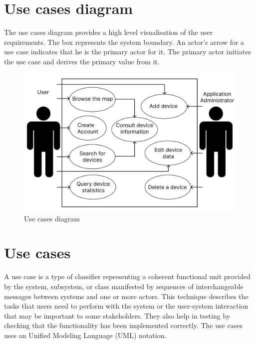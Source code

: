 \documentclass{scrreprt}
\begin{document}
\section{Use cases diagram}

The use cases diagram provides a high level visualisation of the user
requirements. The box represents the system boundary. An actor's arrow
for a use case indicates that he is the primary actor for it.
The primary actor initiates the use case and derives the primary value
from it. \cite{wiegers2013software}
\begin{figure}[H]
    \centering
    \includegraphics[width=15cm]{assets/images/use_cases_diagram.png}
    \caption{Use cases diagram}
    \label{fig:use cases diagram}
\end{figure}

\section{Use cases}

A use case is a type of classifier representing a
coherent functional unit provided by the system, subsystem, or class manifested
by sequences of interchangeable messages between systems and one or more
actors. \cite{UseUsability}
\newline
This technique describes the tasks that users need to perform with
the system or the user-system interaction that may be important to some
stakeholders. They also help in testing by checking that the functionality
has been implemented correctly. The use cases uses an Unified Modeling
Language (UML) notation.
\end{document}
